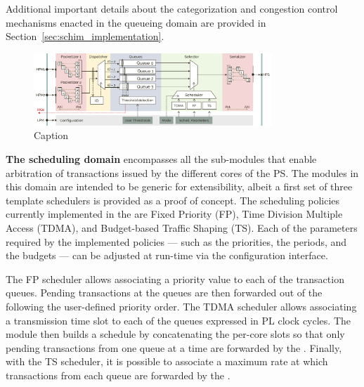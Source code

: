  Additional important details about the
categorization and congestion control mechanisms enacted in the
queueing domain are provided in
Section~\ref{sec:schim_implementation}.

\begin{figure}
  \centering
  \includegraphics[width=0.8\textwidth]{images/SchIM_diagram.png}
  \caption{Caption}
  \label{fig:MemorEDF_module_schema}
\end{figure}

\par{\bf The scheduling domain} encompasses all the sub-modules that
enable arbitration of transactions issued by the different cores of
the PS. The modules in this domain are intended to be generic for
extensibility, albeit a first set of three template schedulers is
provided as a proof of concept.  The scheduling policies currently
implemented in the \schim are Fixed Priority (FP), Time Division
Multiple Access (TDMA), and Budget-based Traffic Shaping (TS).  Each
of the parameters required by the implemented policies --- such as the
priorities, the periods, and the budgets --- can be adjusted at
run-time via the configuration interface.

The FP scheduler allows associating a priority value to each of the
transaction queues. Pending transactions at the queues are then
forwarded out of the \schim following the user-defined priority
order. The TDMA scheduler allows associating a transmission time slot
to each of the queues expressed in PL clock cycles. The module then
builds a schedule by concatenating the per-core slots so that only
pending transactions from one queue at a time are forwarded by the
\schim. Finally, with the TS scheduler, it is possible to associate a
maximum rate at which transactions from each queue are forwarded by
the \schim. 




